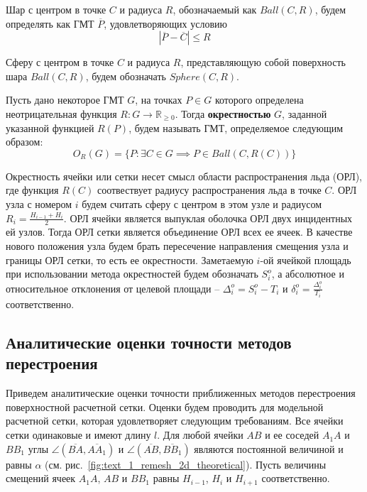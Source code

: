Шар с центром в точке $C$ и радиуса $R$, обозначаемый как $Ball(C, R)$, будем определять как ГМТ $\overline{P}$, удовлетворяющих условию
\begin{equation}
	|\overline{P} - \overline{C}| \le R
\end{equation}

Сферу с центром в точке $C$ и радиуса $R$, представляющую собой поверхность шара $Ball(C, R)$, будем обозначать $Sphere(C, R)$.

\begin{definition}
Пусть дано некоторое ГМТ $G$, на точках $P \in G$ которого определена неотрицательная функция $R: G \rightarrow \mathbb{R}_{\ge 0}$.
Тогда \textbf{окрестностью} $G$, заданной указанной функцией $R(P)$, будем называть ГМТ, определяемое следующим образом:
\begin{equation}
	O_R(G) = \{ P: \exists C \in G \implies P \in Ball(C, R(C)) \}
\end{equation}
\end{definition}

Окрестность ячейки или сетки несет смысл области распространения льда (ОРЛ), где функция $R(C)$ соотвествует радиусу распространения льда в точке $C$.
ОРЛ узла с номером $i$ будем считать сферу с центром в этом узле и радиусом $R_i = \frac{H_{i - 1} + H_i}{2}$.
ОРЛ ячейки является выпуклая оболочка ОРЛ двух инцидентных ей узлов.
Тогда ОРЛ сетки является объединение ОРЛ всех ее ячеек.
В качестве нового положения узла будем брать пересечение направления смещения узла и границы ОРЛ сетки, то есть ее окрестности.
Заметаемую $i$-ой ячейкой площадь при использовании метода окрестностей будем обозначать $S_i^o$, а абсолютное и относительное отклонения от целевой площади -- $\Delta_i^o = S_i^o - T_i$ и $\delta_i^o = \frac{\Delta_i^o}{T_i}$ соответственно.


\subsection{Аналитические оценки точности методов перестроения}

Приведем аналитические оценки точности приближенных методов перестроения поверхностной расчетной сетки.
Оценки будем проводить для модельной расчетной сетки, которая удовлетворяет следующим требованиям.
Все ячейки сетки одинаковые и имеют длину $l$.
Для любой ячейки $AB$ и ее соседей $A_1A$ и $BB_1$ углы $\angle (\overline{BA}, \overline{AA_1})$ и $\angle (\overline{AB}, \overline{BB_1})$ являются постоянной величиной и равны $\alpha$ (см. рис.~\ref{fig:text_1_remesh_2d_theoretical}).
Пусть величины смещений ячеек $A_1A$, $AB$ и $BB_1$ равны $H_{i - 1}$, $H_i$ и $H_{i + 1}$ соответственно.

